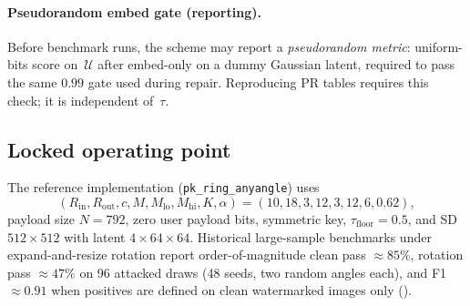 \paragraph{Pseudorandom embed gate (reporting).}
Before benchmark runs, the scheme may report a \emph{pseudorandom metric}:
uniform-bits score on~\(\mathcal{U}\) after embed-only on a dummy Gaussian latent,
required to pass the same \(0.99\) gate used during repair.
Reproducing PR tables requires this check; it is independent of~\(\tau\).

\subsection{Locked operating point}
\label{sec:anyangle-params}

The reference implementation (\texttt{pk\_ring\_anyangle}) uses
\[
(R_{\mathrm{in}},R_{\mathrm{out}},c,M,M_{\mathrm{lo}},M_{\mathrm{hi}},K,\alpha)
=(10,18,3,12,3,12,6,0.62),
\]
payload size \(N=792\), zero user payload bits, symmetric key,
\(\tau_{\mathrm{floor}}=0.5\), and SD~\(512\times512\) with latent
\(4\times64\times64\).
Historical large-sample benchmarks under expand-and-resize rotation report
order-of-magnitude clean pass \(\approx85\%\), rotation pass \(\approx47\%\) on
96 attacked draws (48 seeds, two random angles each), and F1 \(\approx0.91\) when
positives are defined on clean watermarked images only ().
